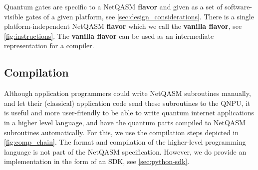 
Quantum gates are specific to a \ac{NetQASM} \textbf{flavor} and given as a set of software-visible gates of a given platform, see \cref{sec:design_considerations}.
There is a single platform-independent \ac{NetQASM} \textbf{flavor} which we call the \textbf{vanilla flavor}, see \cref{fig:instructions}.
The \textbf{vanilla flavor} can be used as an intermediate representation for a compiler.


\subsection{Compilation}
Although application programmers could write \ac{NetQASM} subroutines manually, and let their (classical) application code send these subroutines to the \ac{QNPU}, it is useful and more user-friendly to be able to write quantum internet applications in a higher level language, and have the quantum parts compiled to \ac{NetQASM} subroutines automatically.
For this, we use the compilation steps depicted in \cref{fig:comp_chain}.
The format and compilation of the higher-level programming language is not part of the \ac{NetQASM} specification.
However, we do provide an implementation in the form of an SDK, see \cref{sec:python-sdk}.

